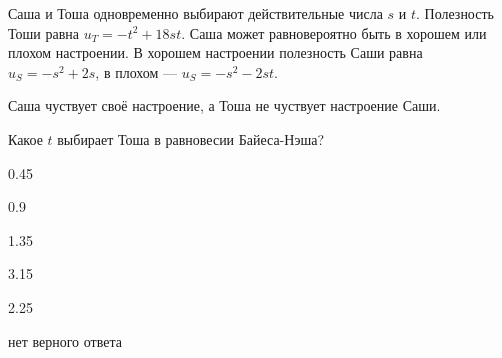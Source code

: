 
\begin{question}
Саша и Тоша одновременно выбирают действительные числа \(s\) и \(t\).
Полезность Тоши равна \(u_T = -t^2 + 18st\).
Саша может равновероятно быть в хорошем или плохом настроении.
В хорошем настроении полезность Саши равна \(u_S = -s^2 + 2s\), в плохом --- \(u_S = -s^2 - 2st\).

Саша чуствует своё настроение, а Тоша не чуствует настроение Саши.

Какое \(t\) выбирает Тоша в равновесии Байеса-Нэша?
\begin{answerlist}
  \item 0.45
  \item 0.9
  \item 1.35
  \item 3.15
  \item 2.25
  \item нет верного ответа
\end{answerlist}
\end{question}


